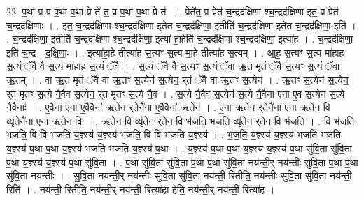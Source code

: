\documentclass[17pt]{extarticle}
\begin{document}
22. प॒था प्र प्र प॒था प॒था प्रे ते॑ त॒ प्र प॒था प॒था प्रे त॑ । . प्रेते॑त॒ प्र प्रेत॑ च॒न्द्रद॑क्षिणा श्च॒न्द्रद॑क्षिणा इत॒ प्र प्रेत॑ च॒न्द्रद॑क्षिणाः । . इ॒त॒ च॒न्द्रद॑क्षिणा श्च॒न्द्रद॑क्षिणा इतेत च॒न्द्रद॑क्षिणा॒ इतीति॑ च॒न्द्रद॑क्षिणा इतेत च॒न्द्रद॑क्षिणा॒ इति॑ । . च॒न्द्रद॑क्षिणा॒ इतीति॑ च॒न्द्रद॑क्षिणा श्च॒न्द्रद॑क्षिणा॒ इत्या॑ हा॒हेति॑ च॒न्द्रद॑क्षिणा श्च॒न्द्रद॑क्षिणा॒ इत्या॑ह । . च॒न्द्रद॑क्षिणा॒ इति॑ च॒न्द्र - द॒क्षि॒णाः॒ । . इत्या॑हा॒हे तीत्या॑ह स॒त्यꣳ स॒त्य मा॒हे तीत्या॑ह स॒त्यम् । . आ॒ह॒ स॒त्यꣳ स॒त्य मा॑हाह स॒त्यं ॅवै वै स॒त्य मा॑हाह स॒त्यं ॅवै । . स॒त्यं ॅवै वै स॒त्यꣳ स॒त्यं ॅवा ऋ॒त मृ॒तं ॅवै स॒त्यꣳ स॒त्यं ॅवा ऋ॒तम् । . वा ऋ॒त मृ॒तं ॅवै वा ऋ॒तꣳ स॒त्येन॑ स॒त्येन॒ र्‌तं ॅवै वा ऋ॒तꣳ स॒त्येन॑ । . ऋ॒तꣳ स॒त्येन॑ स॒त्येन॒ र्‌त मृ॒तꣳ स॒त्ये नै॒वैव स॒त्येन॒ र्‌त मृ॒तꣳ स॒त्ये नै॒व । . स॒त्ये नै॒वैव स॒त्येन॑ स॒त्ये नै॒वैना॑ एना ए॒व स॒त्येन॑ स॒त्ये नै॒वैनाः᳚ । . ए॒वैना॑ एना ए॒वैवैना॑ ऋ॒तेन॒ र्‌तेनै॑ना ए॒वैवैना॑ ऋ॒तेन॑ । . ए॒ना॒ ऋ॒तेन॒ र्‌तेनै॑ना एना ऋ॒तेन॒ वि व्यृ॑तेनै॑ना एना ऋ॒तेन॒ वि । . ऋ॒तेन॒ वि व्यृ॑तेन॒ र्‌तेन॒ वि भ॑जति भजति॒ व्यृ॑तेन॒ र्‌तेन॒ वि भ॑जति । . वि भ॑जति भजति॒ वि वि भ॑जति य॒ज्ञ्स्य॑ य॒ज्ञ्स्य॑ भजति॒ वि वि भ॑जति य॒ज्ञ्स्य॑ । . भ॒ज॒ति॒ य॒ज्ञ्स्य॑ य॒ज्ञ्स्य॑ भजति भजति य॒ज्ञ्स्य॑ प॒था प॒था य॒ज्ञ्स्य॑ भजति भजति य॒ज्ञ्स्य॑ प॒था । . य॒ज्ञ्स्य॑ प॒था प॒था य॒ज्ञ्स्य॑ य॒ज्ञ्स्य॑ प॒था सु॑वि॒ता सु॑वि॒ता प॒था य॒ज्ञ्स्य॑ य॒ज्ञ्स्य॑ प॒था सु॑वि॒ता । . प॒था सु॑वि॒ता सु॑वि॒ता प॒था प॒था सु॑वि॒ता नय॑न्ती॒र् नय॑न्तीः सुवि॒ता प॒था प॒था सु॑वि॒ता नय॑न्तीः । . सु॒वि॒ता नय॑न्ती॒र् नय॑न्तीः सुवि॒ता सु॑वि॒ता नय॑न्ती॒ रितीति॒ नय॑न्तीः सुवि॒ता सु॑वि॒ता नय॑न्ती॒ रिति॑ । . नय॑न्ती॒ रितीति॒ नय॑न्ती॒र् नय॑न्ती॒ रित्या॑हा॒ हेति॒ नय॑न्ती॒र् नय॑न्ती॒ रित्या॑ह । \newline
\end{document}
